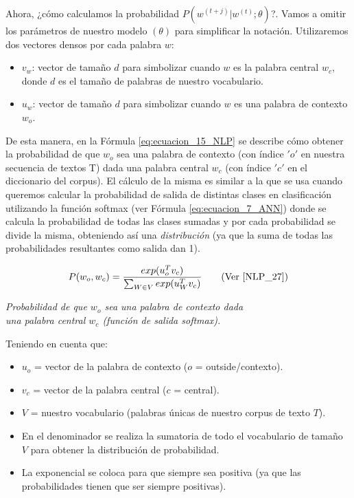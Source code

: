 \documentclass[12pt,a4paper]{article}
\begin{document}
\begin{sloppypar}
Ahora, ¿cómo calculamos la probabilidad $P(w^{(t+j)} | w^{(t)} ; \theta)$?. Vamos a omitir los parámetros de nuestro modelo $(\theta)$ para simplificar la notación. Utilizaremos dos vectores densos por cada palabra $w$:
\begin{itemize}
\item $v_w$: vector de tamaño $d$ para simbolizar cuando $w$ es la palabra central $w_c$, donde $d$ es el tamaño de palabras de nuestro vocabulario.
\item $u_w$: vector de tamaño $d$ para simbolizar cuando $w$ es una palabra de contexto $w_o$.
\end{itemize}

De esta manera, en la Fórmula \ref{eq:ecuacion_15_NLP} se describe cómo obtener la probabilidad de que $w_o$ sea una palabra de contexto (con índice $'o'$ en nuestra secuencia de textos T) dada una palabra central $w_c$ (con índice $'c'$ en el diccionario del corpus).  El cálculo de la misma es similar a la que se usa cuando queremos calcular la probabilidad de salida de distintas clases en clasificación utilizando la función softmax (ver Fórmula \ref{eq:ecuacion_7_ANN}) donde se calcula la probabilidad de todas las clases sumadas y por cada probabilidad se divide la misma, obteniendo así una \textit{distribución} (ya que la suma de todas las probabilidades resultantes como salida dan 1). 

\begin{equation}\label{eq:ecuacion_15_NLP}
P(w_o, w_c) = \frac{exp(u_{o}^{T} v_c)}{\sum_{W \in V} exp(u_{W}^{T} v_c)}    \qquad \text{(Ver \cite{NLP_27})}
\end{equation}
\begin{center}
\textit{ Probabilidad de que $w_o$ sea una palabra de contexto dada \\ una palabra central $w_c$ (función de salida softmax).}
\end{center}

Teniendo en cuenta que:
\begin{itemize}
\item $u_o$ = vector de la palabra de contexto ($o$ = outside/contexto).
\item $v_c$ = vector de la palabra central ($c$ = central).
\item $V$ = nuestro vocabulario (palabras únicas de nuestro corpus de texto $T$). 
\item En el denominador se realiza la sumatoria de todo el vocabulario de tamaño $V$ para obtener la distribución de probabilidad.
\item La exponencial se coloca para que siempre sea positiva (ya que las probabilidades tienen que ser siempre positivas). \\
\end{itemize}



\end{sloppypar}
\end{document}
